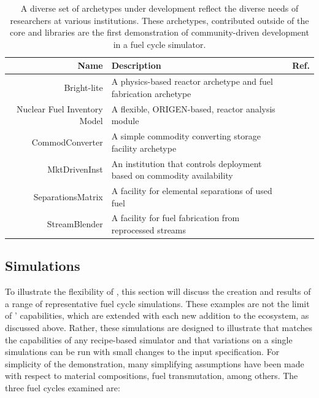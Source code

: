 \begin{table}[htb]
\centering
\begin{tabularx}{\textwidth}{rXr}
\hline
\textbf{Name} & \textbf{Description} & \textbf{Ref.} \\
\hline
Bright-lite & A physics-based reactor archetype and fuel fabrication archetype & \cite{flanagan_bright-lite_2014} \\
Nuclear Fuel Inventory Model & A flexible, ORIGEN-based, reactor analysis module & \cite{skutnik_development_2015} \\
CommodConverter & A simple commodity converting storage facility archetype  & \cite{huff_commodconverter_2014} \\
MktDrivenInst & An institution that controls deployment based on commodity availability & \cite{huff_mktdriveninst_2014} \\
SeparationsMatrix & A facility for elemental separations of used fuel & \cite{huff_streamblender_2014} \\
StreamBlender & A facility for fuel fabrication from reprocessed streams & \cite{huff_streamblender_2014} \\
\hline
\end{tabularx}
\caption{A diverse set of archetypes under development reflect the diverse
needs of researchers at various institutions. These archetypes, contributed
outside of the \Cyclus core and \Cycamore libraries are the first demonstration
of community-driven development in a fuel cycle simulator.}
\label{tab:archetypes}
\end{table}

\subsection{Simulations}
\label{sec:simulations}


To illustrate the flexibility of \Cyclus, this section will discuss the 
creation and results of a range of representative fuel cycle simulations.
These examples are not the limit of \Cyclus' capabilities, which are extended with each new
addition to the ecosystem, as discussed above.  Rather, these simulations are
designed to illustrate that \Cyclus matches the capabilities of any
recipe-based simulator and that variations on a single \Cyclus simulations can 
be run with small changes to the input specification. For simplicity of the 
demonstration, many simplifying assumptions have been
made with respect to material compositions, fuel transmutation, among others.
The three fuel cycles examined are:

